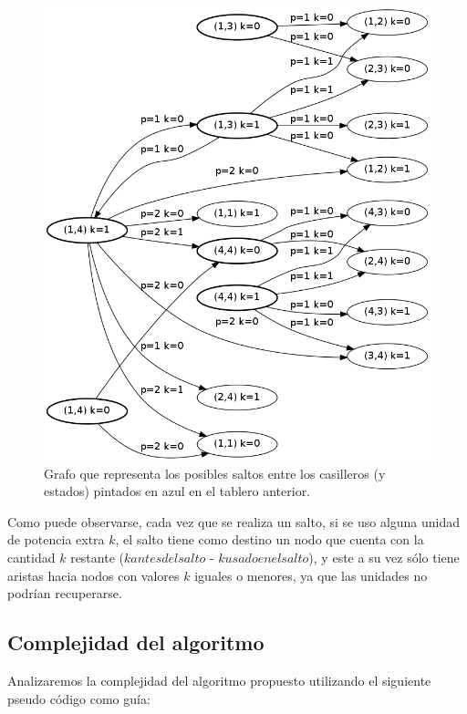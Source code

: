 \begin{figure}[h]
\begin{center}
\includegraphics[scale=0.6]{./img/ej3_grafo.png}
\caption{Grafo que representa los posibles saltos entre los casilleros (y estados) pintados en azul en el tablero anterior.}
\end{center}
\end{figure}

Como puede observarse, cada vez que se realiza un salto, si se uso alguna unidad de potencia extra $k$, el salto tiene como destino un nodo que cuenta con la cantidad $k$ restante ($k antes del salto$ - $k usado en el salto$), y este a su vez s\'olo tiene aristas hacia nodos con valores $k$ iguales o menores, ya que las unidades no podr\'ian recuperarse.


\newpage
\subsection{Complejidad del algoritmo}

Analizaremos la complejidad del algoritmo propuesto utilizando el siguiente pseudo c\'odigo como gu\'ia:

